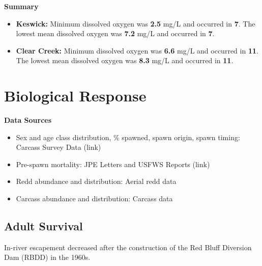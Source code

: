 \documentclass[
]{book}
\providecommand{\tightlist}{%
  \setlength{\itemsep}{0pt}\setlength{\parskip}{0pt}}
\theoremstyle{definition}
\theoremstyle{definition}
\theoremstyle{definition}
\theoremstyle{definition}
\theoremstyle{remark}
\begin{document}
\textbf{Summary}

\begin{itemize}
\tightlist
\item
  \textbf{Keswick:} Minimum dissolved oxygen was \textbf{2.5} mg/L and occurred in \textbf{7}. The lowest mean dissolved oxygen was \textbf{7.2} mg/L and occurred in \textbf{7}.
\item
  \textbf{Clear Creek:} Minimum dissolved oxygen was \textbf{6.6} mg/L and occurred in \textbf{11}. The lowest mean dissolved oxygen was \textbf{8.3} mg/L and occurred in \textbf{11}.
\end{itemize}

\hypertarget{biological-response}{%
\section{Biological Response}\label{biological-response}}

\textbf{Data Sources}

\begin{itemize}
\tightlist
\item
  Sex and age class distribution, \% spawned, spawn origin, spawn timing: Carcass Survey Data (link)
\item
  Pre-spawn mortality: JPE Letters and USFWS Reports (link)
\item
  Redd abundance and distribution: Aerial redd data
\item
  Carcass abundance and distribution: Carcass data
\end{itemize}

\hypertarget{adult-survival}{%
\subsection{Adult Survival}\label{adult-survival}}

In-river escapement decreased after the construction of the Red Bluff Diversion Dam (RBDD) in the 1960s.
\end{document}
